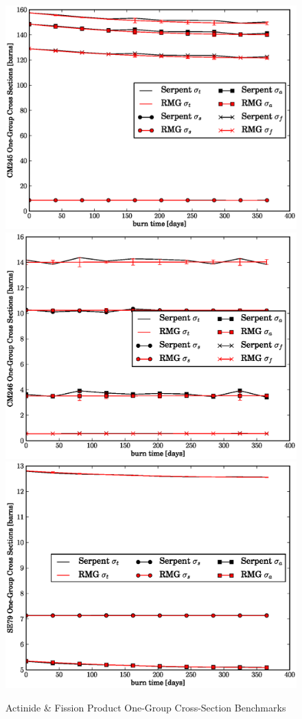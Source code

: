 \begin{figure}[htbp]
\caption{Actinide \& Fission Product One-Group Cross-Section Benchmarks}
\label{act_fp_xs_benchmark}
\begin{center}
\includegraphics[scale=0.3]{multigroup_method/figs/benchmark/CM245_1g_xs.eps}
\includegraphics[scale=0.3]{multigroup_method/figs/benchmark/CM246_1g_xs.eps}
\includegraphics[scale=0.3]{multigroup_method/figs/benchmark/SE79_1g_xs.eps}

\end{center}
\end{figure}
